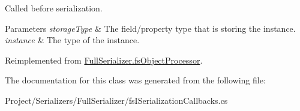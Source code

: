 Called before serialization. 


\begin{DoxyParams}{Parameters}
{\em storage\+Type} & The field/property type that is storing the instance.\\
\hline
{\em instance} & The type of the instance.\\
\hline
\end{DoxyParams}


Reimplemented from \hyperlink{class_full_serializer_1_1fs_object_processor_a48818569c78a826069594fb5ce6e32f2}{Full\+Serializer.\+fs\+Object\+Processor}.



The documentation for this class was generated from the following file\+:\begin{DoxyCompactItemize}
\item 
Project/\+Serializers/\+Full\+Serializer/fs\+I\+Serialization\+Callbacks.\+cs\end{DoxyCompactItemize}
